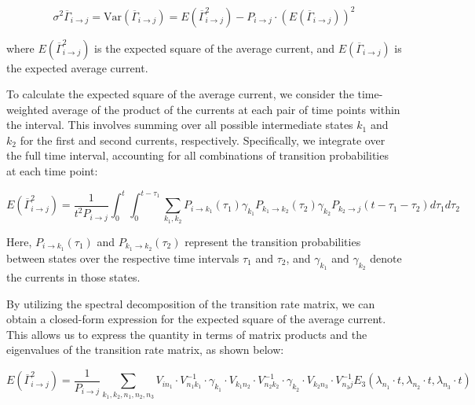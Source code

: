 \documentclass[pdflatex,sn-mathphys-num]{sn-jnl}%
\theoremstyle{thmstyleone}%
\theoremstyle{thmstyletwo}%
\theoremstyle{thmstylethree}%
\begin{document}
\begin{equation}
	\sigma^2 \overline{\Gamma}_{i \rightarrow j}=\text{Var}(\overline{\Gamma}_{i \rightarrow j}) = E(\overline{\Gamma}_{i \rightarrow j}^2) - P_{i \rightarrow j} \cdot \left( E(\overline{\Gamma}_{i \rightarrow j}) \right)^2
    \label{eq:sigma_gamma_expression}
\end{equation}

where \( E(\overline{\Gamma}_{i \rightarrow j}^2) \) is the expected square of the average current, and \( E(\overline{\Gamma}_{i \rightarrow j}) \) is the expected average current.


To calculate the expected square of the average current, we consider the time-weighted average of the product of the currents at each pair of time points within the interval. This involves summing over all possible intermediate states \(k_1\) and \(k_2\) for the first and second currents, respectively. Specifically, we integrate over the full time interval, accounting for all combinations of transition probabilities at each time point:

\begin{equation}
	E(\overline{\Gamma}_{i \rightarrow j}^2) = \frac{1}{t^2 P_{i \rightarrow j}} \int_0^t \int_0^{t-\tau_1} \sum_{k_1, k_2} P_{i \rightarrow k_1}(\tau_1) \gamma_{k_1} P_{k_1 \rightarrow k_2}(\tau_2) \gamma_{k_2} P_{k_2 \rightarrow j}(t-\tau_1-\tau_2) d\tau_1 d\tau_2
    \label{eq:sqr_gamma_integral}
\end{equation}

Here, \(P_{i \rightarrow k_1}(\tau_1)\) and \(P_{k_1 \rightarrow k_2}(\tau_2)\) represent the transition probabilities between states over the respective time intervals \(\tau_1\) and \(\tau_2\), and \(\gamma_{k_1}\) and \(\gamma_{k_2}\) denote the currents in those states.


By utilizing the spectral decomposition of the transition rate matrix, we can obtain a closed-form expression for the expected square of the average current. This allows us to express the quantity in terms of matrix products and the eigenvalues of the transition rate matrix, as shown below:

\begin{equation}
	E(\overline{\Gamma}_{i \rightarrow j}^2) = \frac{1}{P_{i \rightarrow j}} \sum_{k_1, k_2, n_1, n_2, n_3} V_{i n_1} \cdot V^{-1}_{n_1 k_1} \cdot \gamma_{k_1} \cdot V_{k_1 n_2} \cdot V^{-1}_{n_2 k_2} \cdot \gamma_{k_2} \cdot V_{k_2 n_3} \cdot V^{-1}_{n_3 j} E_3(\lambda_{n_1} \cdot t, \lambda_{n_2} \cdot t, \lambda_{n_3} \cdot t)
    \label{eq:sqr_gamma_formula}
\end{equation}
\end{document}
